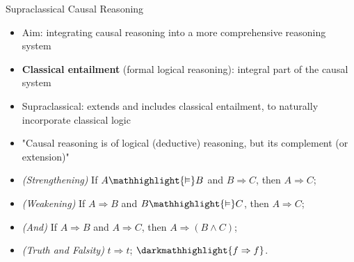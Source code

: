 \documentclass{beamer} %
\begin{document}
\begin{frame}{Supraclassical Causal Reasoning}

    \begin{itemize} 
        \item Aim: integrating causal reasoning into a more comprehensive reasoning system
        \item \textbf{Classical entailment} (formal logical reasoning): integral part of the causal system
        \item Supraclassical: extends and includes classical entailment, to naturally incorporate classical logic
        \item "Causal reasoning is  of logical (deductive) reasoning, but its complement (or extension)" \cite{bochman_logical_2021}
    \end{itemize}
    \begin{itemize}
        \item \textit{(Strengthening)} If $A \mathhighlight{\vDash} B$ and $B \Rightarrow C$, then $A \Rightarrow C$;
        \item \textit{(Weakening)} If $A \Rightarrow B$ and $B \mathhighlight{\vDash} C$, then $A \Rightarrow C$;
        \item \textit{(And)} If $A \Rightarrow B$ and $A \Rightarrow C$, then $A \Rightarrow (B \land C)$;
        \item \textit{(Truth and Falsity)} $t \Rightarrow t$; $\darkmathhighlight{f \Rightarrow f}$.
    \end{itemize}

\end{frame}
\end{document}
